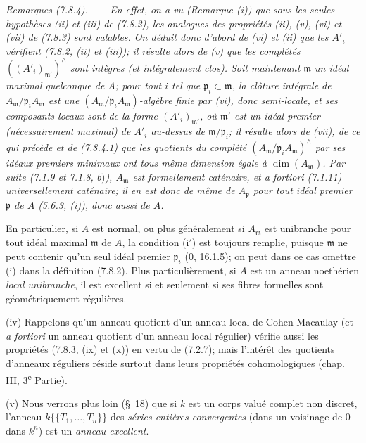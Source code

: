 \documentclass[10pt,oneside]{book}
\newenvironment{remarks}[1][]{%
  \par\medskip\noindent\itshape Remarques (#1). ---\ }{\par}
\begin{document}
\begin{remarks}[7.8.4]
En effet, on a vu (Remarque (i)) que sous les seules hypothèses (ii) et (iii)
de (7.8.2), les \emph{analogues} des propriétés (ii), (v), (vi) et (vii) de
(7.8.3) sont valables. On déduit donc d'abord de (vi) et (ii) que les $A'_i$
vérifient (7.8.2, (ii) et (iii)); il résulte alors de (v) que les complétés
$((A'_i)_{\mathfrak m'})^\wedge$ sont intègres (et intégralement clos). Soit
maintenant $\mathfrak m$ un idéal maximal quelconque de $A$; pour tout $i$ tel
que $\mathfrak p_i\subset\mathfrak m$, la clôture intégrale de
$A_{\mathfrak m}/\mathfrak p_iA_{\mathfrak m}$ est une
$(A_{\mathfrak m}/\mathfrak p_iA_{\mathfrak m})$-algèbre finie par (vi), donc
semi-locale, et ses composants locaux sont de la forme
$(A'_i)_{\mathfrak m'}$, où $\mathfrak m'$ est un idéal premier
(nécessairement maximal) de $A'_i$ au-dessus de
$\mathfrak m/\mathfrak p_i$; il résulte alors de (vii), de ce qui précède et de
(7.8.4.1) que les quotients du complété
$(A_{\mathfrak m}/\mathfrak p_iA_{\mathfrak m})^\wedge$ par ses idéaux
premiers minimaux ont tous même dimension égale à $\dim(A_{\mathfrak m})$. Par
suite (7.1.9 et 7.1.8, $b)$), $A_{\mathfrak m}$ est formellement caténaire, et
\emph{a fortiori} (7.1.11) universellement caténaire; il en est donc de même de
$A_{\mathfrak p}$ pour tout idéal premier $\mathfrak p$ de $A$ (5.6.3, (i)),
donc aussi de $A$.

En particulier, si $A$ est normal, ou plus généralement si $A_{\mathfrak m}$
est unibranche pour tout idéal maximal $\mathfrak m$ de $A$, la condition
(i$'$) est toujours remplie, puisque $\mathfrak m$ ne peut contenir qu'un seul
idéal premier $\mathfrak p_i$ (0, 16.1.5); on peut dans ce cas omettre (i) dans
la définition (7.8.2). Plus particulièrement, si $A$ est un anneau noethérien
\emph{local unibranche}, il est excellent si et seulement si ses fibres
formelles sont géométriquement régulières.

(iv) Rappelons qu'un anneau quotient d'un anneau local de Cohen-Macaulay (et
\emph{a fortiori} un anneau quotient d'un anneau local régulier) vérifie aussi
les propriétés (7.8.3, (ix) et (x)) en vertu de (7.2.7); mais l'intérêt des
quotients d'anneaux réguliers réside surtout dans leurs propriétés
cohomologiques (chap. III, 3\textsuperscript{e} Partie).

(v) Nous verrons plus loin (\S~18) que si $k$ est un corps valué complet non
discret, l'anneau $k\{\!\{T_1,\ldots,T_n\}\!\}$ des \emph{séries entières
convergentes} (dans un voisinage de $0$ dans $k^n$) est un \emph{anneau
excellent}.
\end{remarks}
\end{document}
